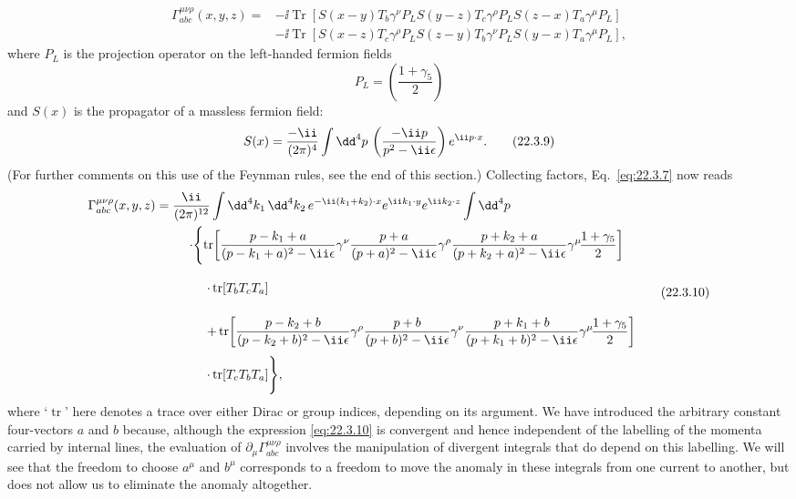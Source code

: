 \begin{equation}
 \begin{aligned}
 \Gamma_{abc}^{\mu\nu\rho}(x,y,z)
 ={}&-\ii\operatorname{Tr}\!\left[
  S(x-y)T_b\gamma^\nu P_L
  S(y-z)T_c\gamma^\rho P_L
  S(z-x)T_a\gamma^\mu P_L
 \right]
 \\
 &-\ii\operatorname{Tr}\!\left[
  S(x-z)T_c\gamma^\rho P_L
  S(z-y)T_b\gamma^\nu P_L
  S(y-x)T_a\gamma^\mu P_L
 \right],
 \end{aligned}
 \tag{22.3.7}\label{eq:22.3.7}
\end{equation}
where $P_L$ is the projection operator on the left-handed fermion fields
\begin{equation}
 P_L=\left(\frac{1+\gamma_5}{2}\right)
 \tag{22.3.8}\label{eq:22.3.8}
\end{equation}
and $S(x)$ is the propagator of a massless fermion field:
\begin{equation}
 S(x)=\frac{-\ii}{(2\pi)^4}\int \dd^4p\,
 \left(\frac{-\ii\sl{p}}{p^2-\ii\epsilon}\right)e^{\ii p\cdot x}.
 \tag{22.3.9}\label{eq:22.3.9}
\end{equation}
(For further comments on this use of the Feynman rules, see the end of this
section.) Collecting factors, Eq.~\eqref{eq:22.3.7} now reads
\begin{equation}
 \begin{aligned}
 \Gamma_{abc}^{\mu\nu\rho}(x,y,z)
 ={}&\frac{\ii}{(2\pi)^{12}}
 \int \dd^4k_1\,\dd^4k_2\,
 e^{-\ii(k_1+k_2)\cdot x}e^{\ii k_1\cdot y}e^{\ii k_2\cdot z}
 \int \dd^4p
 \\
 &\mathrel{\phantom{=}}\cdot
 \Biggl\{
 \operatorname{tr}\!\left[
  \frac{\sl{p}-\sl{k}_1+\sl{a}}{(p-k_1+a)^2-\ii\epsilon}\gamma^\nu
  \frac{\sl{p}+\sl{a}}{(p+a)^2-\ii\epsilon}\gamma^\rho
  \frac{\sl{p}+\sl{k}_2+\sl{a}}{(p+k_2+a)^2-\ii\epsilon}\gamma^\mu
  \!\frac{1+\gamma_5}{2}
 \right]
 \\
 &\mathrel{\phantom{=\cdot\Biggl\{}}\cdot
 \operatorname{tr}[T_b T_c T_a]
 \\
 &\mathrel{\phantom{=\cdot\Biggl\{}}+
 \operatorname{tr}\!\left[
  \frac{\sl{p}-\sl{k}_2+\sl{b}}{(p-k_2+b)^2-\ii\epsilon}\gamma^\rho
  \frac{\sl{p}+\sl{b}}{(p+b)^2-\ii\epsilon}\gamma^\nu
  \frac{\sl{p}+\sl{k}_1+\sl{b}}{(p+k_1+b)^2-\ii\epsilon}\gamma^\mu
  \!\frac{1+\gamma_5}{2}
 \right]
 \\
 &\mathrel{\phantom{=\cdot\Biggl\{}}\cdot
 \operatorname{tr}[T_c T_b T_a]
 \Biggr\},
 \end{aligned}
 \tag{22.3.10}\label{eq:22.3.10}
\end{equation}
where `$\operatorname{tr}$' here denotes a trace over either Dirac or group
indices, depending on its argument. We have introduced the arbitrary
constant four-vectors $a$ and $b$ because, although the expression
\eqref{eq:22.3.10} is convergent and hence independent of the labelling of
the momenta carried by internal lines, the evaluation of
$\partial_\mu\Gamma_{abc}^{\mu\nu\rho}$ involves the
manipulation of divergent integrals that do depend on this labelling. We
will see that the freedom to choose $a^\mu$ and $b^\mu$ corresponds to a
freedom to move the anomaly in these integrals from one current to another,
but does not allow us to eliminate the anomaly altogether.

